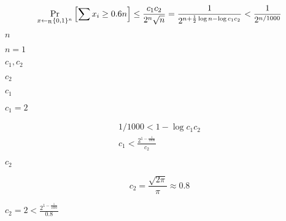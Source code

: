 \documentclass[10pt]{book}
\begin{document}
\begin{mdSnippets}
\begin{mdDisplaySnippet}[90d23468d32cd498f9fd52729e8f3662]%
\[%
\Pr_{x \getsr \zo^n}\left[\sum x_i \geq 0.6n \right] \leq \frac{c_1c_2}{2^{n}\sqrt{n}} = \frac{1}{2^{n + \frac{1}{2} \log n - \log c_1 c_2}} < \frac{1}{2^{n/1000}}
\]%
\end{mdDisplaySnippet}%
\begin{mdInlineSnippet}[7b8b965ad4bca0e41ab51de7b31363a1]%
$n$\end{mdInlineSnippet}%
\begin{mdInlineSnippet}[ab78ccfbcd04b1ba22eb9427251cb20d]%
$n = 1$\end{mdInlineSnippet}%
\begin{mdInlineSnippet}%
$c_1,c_2$\end{mdInlineSnippet}%
\begin{mdInlineSnippet}[71f0427a673c14326195285a092cc63a]%
$c_2$\end{mdInlineSnippet}%
\begin{mdInlineSnippet}%
$c_1$\end{mdInlineSnippet}%
\begin{mdInlineSnippet}[cbab593f61bc7ba112e6a2d814a6c1f3]%
$c_1 = 2$\end{mdInlineSnippet}%
\begin{mdDisplaySnippet}%
\[%
\begin{aligned}
1/1000 < 1 - \log c_1 c_2 \\
c_1 < \frac{2^{1 - \frac{1}{1000}}}{c_2}
\end{aligned}
\]%
\end{mdDisplaySnippet}%
\begin{mdInlineSnippet}[71f0427a673c14326195285a092cc63a]%
$c_2$\end{mdInlineSnippet}%
\begin{mdDisplaySnippet}[03b19ebd8f4e81ec01a2622ed4df854d]%
\[%
c_2 = \frac{\sqrt{2\pi}}{\pi} \approx 0.8
\]%
\end{mdDisplaySnippet}%
\begin{mdInlineSnippet}[9077110897e7c78b743689bdfedfd0ff]%
$c_2 = 2 < \frac{2^{1 - \frac{1}{1000}}}{0.8}$\end{mdInlineSnippet}%

\end{mdSnippets}
\end{document}
